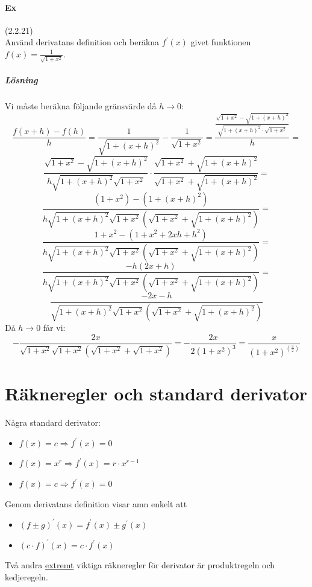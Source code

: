 \paragraph{Ex}(2.2.21)\\
Använd derivatans definition och beräkna $f^\prime(x)$ givet funktionen $f(x)=\frac{1}{\sqrt{1+x^2}}$.
\subparagraph{Lösning}
Vi måste beräkna följande gränsvärde då $h\to 0$:
\begin{equation*}
    \frac{f(x+h)-f(h)}{h}=
    \frac{1}{\sqrt{1+(x+h)^2}}-\frac{1}{\sqrt{1+x^2}}=
    \frac{\frac{\sqrt{1+x^2}-\sqrt{1+(x+h)^2}}{\sqrt{1+(x+h)^2}\cdot\sqrt{1+x^2}}}{h}=
\end{equation*}
\begin{equation*}
    \frac{\sqrt{1+x^2}-\sqrt{1+(x+h)^2}}{h\sqrt{1+(x+h)^2}\sqrt{1+x^2}}\cdot\frac{\sqrt{1+x^2}+\sqrt{1+(x+h)^2}}{\sqrt{1+x^2}+\sqrt{1+(x+h)^2}}=
\end{equation*}
\begin{equation*}
    \frac{(1+x^2)-(1+(x+h)^2)}{h\sqrt{1+(x+h)^2}\sqrt{1+x^2}(\sqrt{1+x^2}+\sqrt{1+(x+h)^2})}=
\end{equation*}
\begin{equation*}
    \frac{1+x^2-(1+x^2+2xh+h^2)}{h\sqrt{1+(x+h)^2}\sqrt{1+x^2}(\sqrt{1+x^2}+\sqrt{1+(x+h)^2})}=
\end{equation*}
\begin{equation*}
    \frac{-h(2x+h)}{h\sqrt{1+(x+h)^2}\sqrt{1+x^2}(\sqrt{1+x^2}+\sqrt{1+(x+h)^2})}=
\end{equation*}
\begin{equation*}
    \frac{-2x-h}{\sqrt{1+(x+h)^2}\sqrt{1+x^2}(\sqrt{1+x^2}+\sqrt{1+(x+h)^2})}
\end{equation*}
Då $h\to 0$ får vi:
\begin{equation*}
    -\frac{2x}{\sqrt{1+x^2}\sqrt{1+x^2}(\sqrt{1+x^2}+\sqrt{1+x^2})}=
    -\frac{2x}{2(1+x^2)^3}=
    \frac{x}{(1+x^2)^(\frac{3}{2})}
\end{equation*}

\section{Räkneregler och standard derivator}
Några standard derivator:
\begin{itemize}
    \item $f(x)=c \Rightarrow f^\prime(x)=0$
    \item $f(x)=x^r \Rightarrow f^\prime(x)=r\cdot x^{r-1}$
    \item $f(x)=c \Rightarrow f^\prime(x)=0$
\end{itemize}
Genom derivatans definition visar amn enkelt att
\begin{itemize}
    \item $(f\pm g)^\prime(x)=f^\prime(x)\pm g^\prime(x)$
    \item $(c\cdot f)^\prime(x)=c \cdot f^\prime(x)$
\end{itemize}
Två andra \underline{extremt} viktiga räkneregler för derivator är produktregeln och kedjeregeln.
